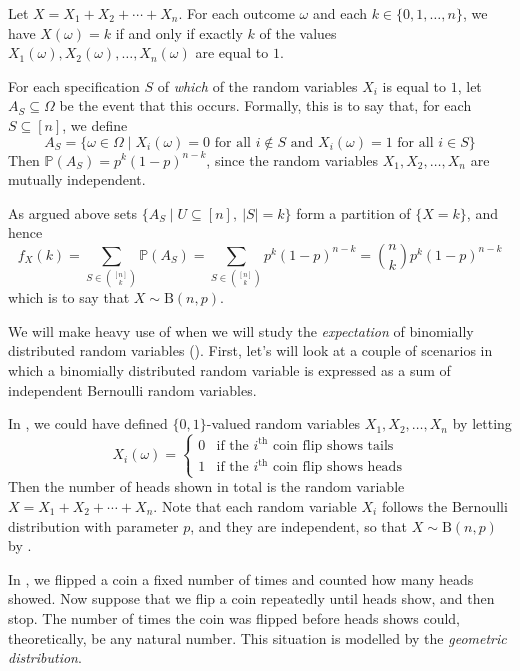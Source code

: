 \begin{cproof}
Let $X=X_1+X_2+\cdots+X_n$. For each outcome $\omega$ and each $k \in \{0,1,\dots,n\}$, we have $X(\omega)=k$ if and only if exactly $k$ of the values $X_1(\omega),X_2(\omega),\dots,X_n(\omega)$ are equal to $1$.

For each specification $S$ of \textit{which} of the random variables $X_i$ is equal to $1$, let $A_S \subseteq \Omega$ be the event that this occurs. Formally, this is to say that, for each $S \subseteq [n]$, we define
\[ A_S = \{ \omega \in \Omega \mid X_i(\omega) = 0 \text{ for all } i \not \in S \text{ and } X_i(\omega) = 1 \text{ for all } i \in S \} \]
Then $\mathbb{P}(A_S) = p^k(1-p)^{n-k}$, since the random variables $X_1,X_2,\dots,X_n$ are mutually independent.

As argued above sets $\{ A_S \mid U \subseteq [n],\ |S|=k \}$ form a partition of $\{ X = k \}$, and hence
\[ f_X(k) = \sum_{S \in \binom{[n]}{k}} \mathbb{P}(A_S) = \sum_{S \in \binom{[n]}{k}} p^k(1-p)^{n-k} = \binom{n}{k}p^k(1-p)^{n-k} \]
which is to say that $X \sim \mathrm{B}(n,p)$.
\end{cproof}

We will make heavy use of  when we will study the \textit{expectation} of binomially distributed random variables (). First, let's will look at a couple of scenarios in which a binomially distributed random variable is expressed as a sum of independent Bernoulli random variables.

\begin{example}
In , we could have defined
$\{0,1\}$-valued random variables $X_1,X_2,\dots,X_n$ by letting
\[ X_i(\omega) = \begin{cases} 0 & \text{if the } i^{\text{th}} \text{ coin flip shows tails} \\ 1 & \text{if the } i^{\text{th}} \text{ coin flip shows heads} \end{cases} \]
Then the number of heads shown in total is the random variable $X = X_1+X_2+\cdots+X_n$. Note that each random variable $X_i$ follows the Bernoulli distribution with parameter $p$, and they are independent, so that $X \sim \mathrm{B}(n,p)$ by .
\end{example}

In , we flipped a coin a fixed number of times and counted how many heads showed. Now suppose that we flip a coin repeatedly until heads show, and then stop. The number of times the coin was flipped before heads shows could, theoretically, be any natural number. This situation is modelled by the \textit{geometric distribution}.

